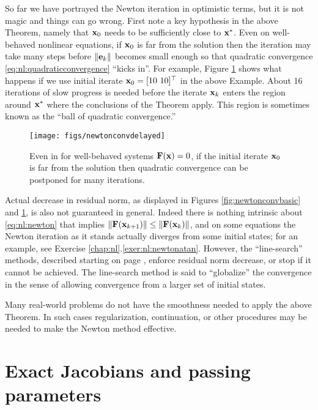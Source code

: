 So far we have portrayed the Newton iteration in optimistic terms, but it is not magic and things can go wrong.  First note a key hypothesis in the above Theorem, namely that $\mathbf{x}_0$ needs to be sufficiently close to $\mathbf{x}^*$.  Even on well-behaved nonlinear equations, if $\mathbf{x}_0$ is far from the solution then the iteration may take many steps before $\|\mathbf{e}_k\|$ becomes small enough so that quadratic convergence \eqref{eq:nl:quadraticconvergence} ``kicks in''.  For example, Figure \ref{fig:newtonconvdelayed} shows what happens if we use initial iterate $\mathbf{x}_0=[10\,\, 10]^\top$ in the above Example.  About 16 iterations of slow progress is needed before the iterate $\mathbf{x}_k$ enters the region around $\mathbf{x}^*$ where the conclusions of the Theorem apply.  This region is sometimes known as the ``ball of quadratic convergence.''

\begin{figure}
\texttt{[image: figs/newtonconvdelayed]}
\caption{Even in for well-behaved systems $\mathbf{F}(\mathbf{x})=0$, if the initial iterate $\mathbf{x}_0$ is far from the solution then quadratic convergence can be postponed for many iterations.}
\label{fig:newtonconvdelayed}
\end{figure}

Actual decrease in residual norm, as displayed in Figures \ref{fig:newtonconvbasic} and \ref{fig:newtonconvdelayed}, is also not guaranteed in general.  Indeed there is nothing intrinsic about \eqref{eq:nl:newton} that implies $\|\mathbf{F}(\mathbf{x}_{k+1})\| \le \|\mathbf{F}(\mathbf{x}_k)\|$, and on some equations the Newton iteration as it stands actually diverges from some initial states; for an example, see Exercise \ref{chap:nl}.\ref{exer:nl:newtonatan}.  However, the ``line-search'' methods, described starting on page \pageref{sec:linesearch}, enforce residual norm decrease, or stop if it cannot be achieved.  The line-search method is said to ``globalize'' the convergence \citep{Kelley2003} in the sense of allowing convergence from a larger set of initial states.

Many real-world problems do not have the smoothness needed to apply the above Theorem.  In such cases regularization, continuation, or other procedures may be needed to make the Newton method effective.


\section{Exact Jacobians and passing parameters}

